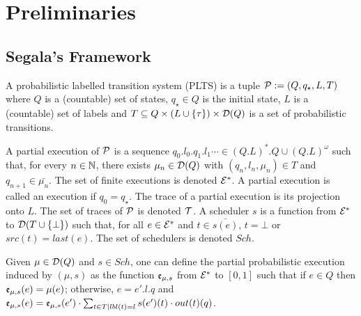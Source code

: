 \section{Preliminaries}

\subsection{Segala's Framework}

\begin{definition}

    A probabilistic labelled transition system (PLTS) is a tuple $\mathcal{P} := (Q,q_\star,L,T)$
    where $Q$ is a (countable) set of states,
    $q_\star \in Q$ is the initial state,
    $L$ is a (countable) set of labels and
    $T \subseteq Q \times (L \cup \{\tau\}) \times \mathcal{D}(Q)$ is a set of probabilistic transitions.
\end{definition}

A partial execution of $\mathcal{P}$ is a sequence
$q_0.l_0.q_1.l_1\cdots \in (Q.L)^*.Q \cup (Q.L)^\omega$ such that, for every $n \in \mathbb{N}$, there
exists $\mu_n \in \mathcal{D}(Q)$ with $(q_n,l_n,\mu_n) \in T$ and $q_{n+1} \in \bar{\mu_n}$. The set of
finite executions is denoted $\mathcal{E}^*$. A partial execution is called an execution if
$q_0 = q_\star$. The trace of a partial execution is its projection onto $L$. The set of traces of
$\mathcal{P}$ is denoted $\mathcal{T}$. A scheduler $s$ is a function from $\mathcal{E}^*$ to $\mathcal{D}(T \cup \{\bot\})$
such that, for all $e \in \mathcal{E}^*$ and $t \in \bar{s(e)}$, $t = \bot$ or $src(t) = last(e)$. The
set of schedulers is denoted $Sch$.

\begin{definition}

    Given $\mu \in \mathcal{D}(Q)$ and $s \in Sch$, one can define the partial probabilistic execution
    induced by $(\mu,s)$ as the function $\mathfrak{e}_{\mu,s}$ from $\mathcal{E}^*$ to $[0,1]$ such that if
    $e \in Q$ then $\mathfrak{e}_{\mu,s}(e) = \mu(e)$; otherwise, $e = e'.l.q$ and
    $\mathfrak{e}_{\mu,s}(e) =
    \mathfrak{e}_{\mu,s}(e')\cdot\sum_{t \in T \mid lbl(t) = l}s(e')(t)\cdot out(t)(q)$.
\end{definition}

